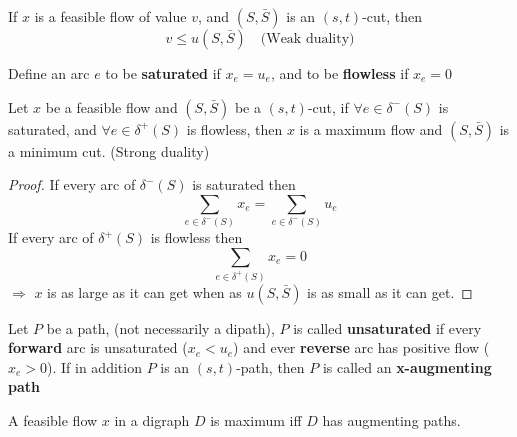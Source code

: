 
			\begin{corollary}
				If $x$ is a feasible flow of value $v$, and $(S, \bar{S})$ is an $(s, t)$-cut, then
				\begin{equation}
					v \le u(S, \bar{S}) \quad \text{(Weak duality)}
				\end{equation}
			\end{corollary}

			\begin{definition}
				Define an arc $e$ to be \textbf{saturated} if $x_e = u_e$, and to be \textbf{flowless} if $x_e = 0$
			\end{definition}

			\begin{corollary}
				Let $x$ be a feasible flow and $(S, \bar{S})$ be a $(s, t)$-cut, if $\forall e\in \delta^-(S)$ is saturated, and $\forall e\in \delta^+(S)$ is flowless, then $x$ is a maximum flow and $(S, \bar{S})$ is a minimum cut. (Strong duality)
			\end{corollary}

			\begin{proof}
				If every arc of $\delta^-(S)$ is saturated then
				\begin{equation}
					\sum_{e\in \delta^-(S)}x_e = \sum_{e\in \delta^-(S)}u_e
				\end{equation}
				If every arc of $\delta^+(S)$ is flowless then
				\begin{equation}
					\sum_{e\in \delta^+(S)}x_e = 0
				\end{equation}
				$\Rightarrow$ $x$ is as large as it can get when as $u(S, \bar{S})$ is as small as it can get.
			\end{proof}

			\begin{definition}
				Let $P$ be a path, (not necessarily a dipath), $P$ is called \textbf{unsaturated} if every \textbf{forward} arc is unsaturated ($x_e < u_e$) and ever \textbf{reverse} arc has positive flow ($x_e > 0$). If in addition $P$ is an $(s, t)$-path, then $P$ is called an \textbf{x-augmenting path}
			\end{definition}

			\begin{theorem}
				A feasible flow $x$ in a digraph $D$ is maximum iff $D$ has augmenting paths.
			\end{theorem}
			
